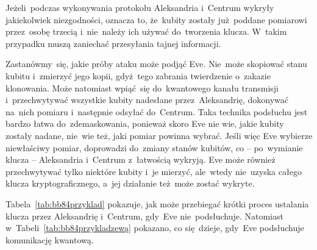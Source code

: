 Jeżeli~podczas wykonywania protokołu Aleksandria i~Centrum wykryły
jakiekolwiek niezgodności, oznacza to, że~kubity zostały już~poddane
pomiarowi przez~osobę trzecią i~nie~należy ich używać do~tworzenia
klucza. W~takim przypadku muszą zaniechać przesyłania tajnej informacji.

Zastanówmy~się, jakie próby ataku może podjąć Eve. Nie~może skopiować
stanu kubitu i~zmierzyć jego kopii, gdyż~tego zabrania twierdzenie
o~zakazie klonowania. Może natomiast wpiąć~się do~kwantowego kanału
transmisji i~przechwytywać wszystkie kubity nadesłane przez~Aleksandrię,
dokonywać na~nich pomiaru i~następnie odsyłać do~Centrum. Taka technika
podsłuchu jest bardzo łatwa do~zdemaskowania, ponieważ skoro Eve nie wie, jakie
kubity zostały nadane, nie~wie też, jaki pomiar powinna wybrać. Jeśli więc Eve wybierze
niewłaściwy pomiar, doprowadzi do~zmiany stanów kubitów, co --
po~wymianie klucza -- Aleksandria i~Centrum z~łatwością wykryją. Eve
może również przechwytywać tylko niektóre kubity i~je mierzyć, ale~wtedy
nie~uzyska całego klucza kryptograficznego, a~jej działanie też~może
zostać wykryte.

Tabela~\ref{tab:bb84przyklad} pokazuje, jak może przebiegać krótki
proces ustalania klucza przez Aleksandrię i~Centrum, gdy~Eve
nie~podsłuchuje. Natomiast w~Tabeli~\ref{tab:bb84przykladzewą} pokazano,
co się~dzieje, gdy~Eve podsłuchuje komunikację kwantową.

